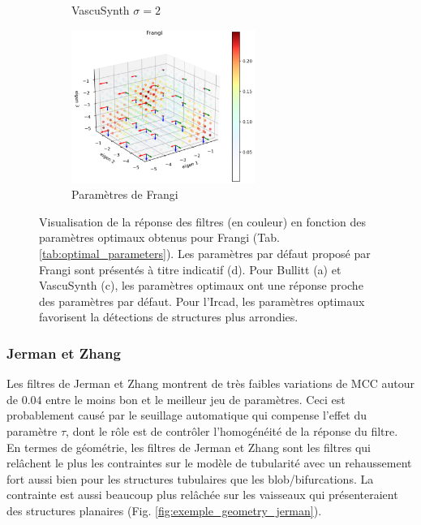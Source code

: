 \begin{figure}[H]
\begin{subfigure}[t]{0.45\textwidth}
    \caption{VascuSynth $\sigma=2$}
  \end{subfigure}
  \begin{subfigure}[t]{0.45\textwidth}
    \centering
    \includegraphics[height=5cm]{Images/Frangi_default_P.png}
    \caption{Paramètres de Frangi}
  \end{subfigure}
  \caption{Visualisation de la réponse des filtres (en couleur) en fonction des paramètres optimaux obtenus pour Frangi (Tab. \ref{tab:optimal_parameters}). Les paramètres par défaut proposé par Frangi sont présentés à titre indicatif (d). Pour Bullitt (a) et VascuSynth (c), les paramètres optimaux ont une réponse proche des paramètres par défaut. Pour l'Ircad, les paramètres optimaux favorisent la détections de structures plus arrondies.}
  \label{fig:exemple_geometry_frangi}
\end{figure}

\subsubsection{Jerman et Zhang}
Les filtres de Jerman et Zhang montrent de très faibles variations de MCC autour de $0.04$ entre le moins bon et le meilleur jeu de paramètres. Ceci est probablement causé par le seuillage automatique qui compense l'effet du paramètre $\tau$, dont le rôle est de contrôler l'homogénéité de la réponse du filtre. En termes de géométrie, les filtres de Jerman et Zhang sont les filtres qui relâchent le plus les contraintes sur le modèle de tubularité avec un rehaussement fort aussi bien pour les structures tubulaires que les blob/bifurcations. La contrainte est aussi beaucoup plus relâchée sur les vaisseaux qui présenteraient des structures planaires (Fig. \ref{fig:exemple_geometry_jerman}).

